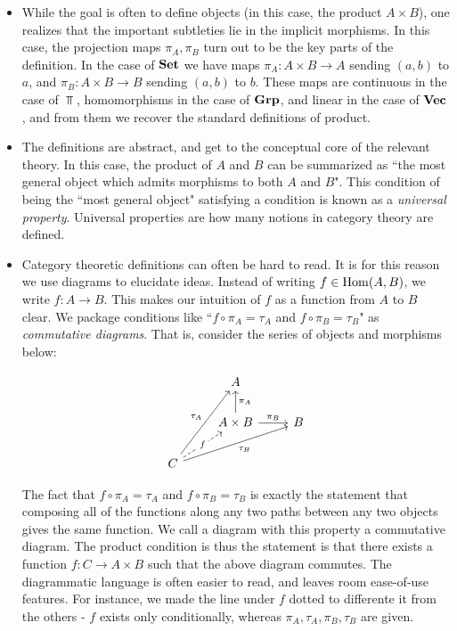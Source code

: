 \documentclass{article}
\theoremstyle{definition}
\numberwithin{figure}{section}
\begin{document}
\begin{itemize}
\item While the goal is often to define objects (in this case, the product $A\times B$), one realizes that the important subtleties lie in the implicit morphisms. In this case, the projection maps $\pi_A,\pi_B$ turn out to be the key parts of the definition. In the case of $\bold{Set}$ we have maps $\pi_A: A\times B\to A$ sending $(a,b)$ to $a$, and $\pi_B: A\times B\to B$ sending $(a,b)$ to $b$. These maps are continuous in the case of $\Top$, homomorphisms in the case of $\bold{Grp}$, and linear in the case of $\bold{Vec}$, and from them we recover the standard definitions of product.

\item The definitions are abstract, and get to the conceptual core of the relevant theory. In this case, the product of $A$ and $B$ can be summarized as ``the most general object which admits morphisms to both $A$ and $B$". This condition of being the ``most general object" satisfying a condition is known as a \textit{universal property}. Universal properties are how many notions in category theory are defined.

\item Category theoretic definitions can often be hard to read. It is for this reason we use diagrams to elucidate ideas. Instead of writing $f\in \mathrm{Hom}(A,B)$, we write $f:A\to B$. This makes our intuition of $f$ as a function from $A$ to $B$ clear. We package conditions like ``$f\circ \pi_A=\tau_A$ and $f\circ \pi_B=\tau_B$" as \textit{commutative diagrams}. That is, consider the series of objects and morphisms below:

\[\begin{tikzcd}
	& A \\
	& {A\times B} & B \\
	C
	\arrow["{\pi_A}"', from=2-2, to=1-2]
	\arrow["{\pi_B}", from=2-2, to=2-3]
	\arrow["f"{description}, dashed, from=3-1, to=2-2]
	\arrow["{\tau_A}", from=3-1, to=1-2]
	\arrow["{\tau_B}"', from=3-1, to=2-3]
\end{tikzcd}\]

The fact that $f\circ \pi_A=\tau_A$ and $f\circ \pi_B=\tau_B$ is exactly the statement that composing all of the functions along any two paths between any two objects gives the same function. We call a diagram with this property a commutative diagram. The product condition is thus the statement is that there exists a function $f:C\to A\times B$ such that the above diagram commutes. The diagrammatic language is often easier to read, and leaves room ease-of-use features. For instance, we made the line under $f$ dotted to differente it from the others - $f$ exists only conditionally, whereas $\pi_A,\tau_A,\pi_B,\tau_B$ are given.
\end{itemize}
\end{document}
